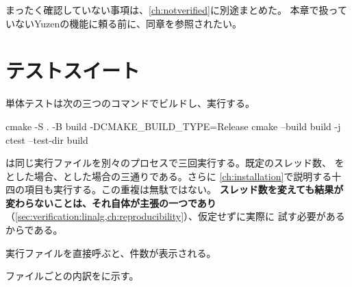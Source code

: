 まったく確認していない事項は、\cref{ch:notverified}に別途まとめた。
本章で扱っていないYuzenの機能に頼る前に、同章を参照されたい。

\section{テストスイート}
\label{sec:verification:suite}

単体テストは次の三つのコマンドでビルドし、実行する。

\begin{shell}
cmake -S . -B build -DCMAKE_BUILD_TYPE=Release
cmake --build build -j
ctest --test-dir build
\end{shell}

は同じ実行ファイルを別々のプロセスで三回実行する。既定のスレッド数、
をとした場合、とした場合の三通りである。さらに
\cref{ch:installation}で説明する十四の項目も実行する。この重複は無駄ではない。
\textbf{スレッド数を変えても結果が変わらないことは、それ自体が主張の一つであり}
（\cref{sec:verification:linalg,ch:reproducibility}）、仮定せずに実際に
試す必要があるからである。

実行ファイルを直接呼ぶと、件数が表示される。


ファイルごとの内訳をに示す。

